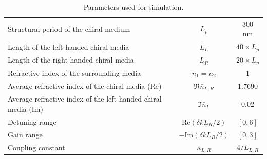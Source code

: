 \begin{table}
	\centering
	\begin{tabulary}{\linewidth}{LCC}
		\hline
		\hline
		Structural period of the chiral medium & $L_p$ & 300 nm \\
		Length of the left-handed chiral media & $L_L$ & $40\times L_p$ \\
		Length of the right-handed chiral media & $L_R$ & $20\times L_p$ \\
		Refractive index of the surrounding media & $n_1=n_2$ & 1 \\
		Average refractive index of the chiral media (Re) & $\Re{\bar{n}_{L,R}}$ & 1.7690 \\
		Average refractive index of the left-handed chiral media (Im) & $\Im{\bar{n}_L}$ & 0.02 \\
		Detuning range & $\mathrm{Re}(\delta k L_R / 2)$ & $[0,6]$ \\
		Gain range & $-\mathrm{Im}(\delta k L_R / 2)$ & $[0,3]$ \\
		Coupling constant & $\kappa_{L,R}$ & $4/L_{L,R}$\\
		\hline
		\hline
	\end{tabulary}
	\caption[Parameters for the cavity with a defect]{Parameters used for simulation.}
	\label{tab:hybrid_cavity:simulation}
\end{table}


